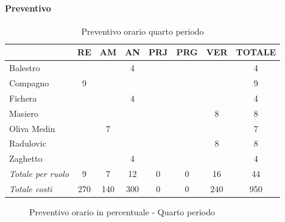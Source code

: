 \documentclass[a4paper,12pt]{article}
\begin{document}
            \paragraph{Preventivo}
                \begin{table}[H]
                \centering
                \caption{Preventivo orario quarto periodo}
                \begin{tabular}{|l|c|c|c|c|c|c|c|}
                \hline
                    \rowcolor{lightgray}{\textbf{Membro}} & {\textbf{RE}} & {\textbf{AM}} & {\textbf{AN}} & {\textbf{PRJ}} & {\textbf{PRG}} & {\textbf{VER}} & {\textbf{TOTALE}}\\
                \hline
                    Balestro & & & 4 & & & & 4\\
                \hline
                    Compagno & 9 & & & & & & 9\\
                \hline
                    Fichera & & & 4 & & & & 4\\
                \hline
                    Masiero & & & & & & 8 & 8\\
                \hline
                    Oliva Medin & & 7 & & & & & 7\\
                \hline
                    Radulovic & & & & & & 8 & 8\\
                \hline
                    Zaghetto & & & 4 & & & & 4\\
                \hline
                    \rowcolor{lightgray}\textit{Totale per ruolo} & 9 & 7 & 12 & 0 & 0 & 16 & 44\\
                \hline
                    \rowcolor{lightgray}\textit{Totale costi} & 270 & 140 & 300 & 0 & 0 & 240 & 950\\
                \hline
                \end{tabular}
                \end{table}

                \begin{figure}[H]
                \centering
                \caption{Preventivo orario in percentuale - Quarto periodo}
                \end{figure}
                
\end{document}
